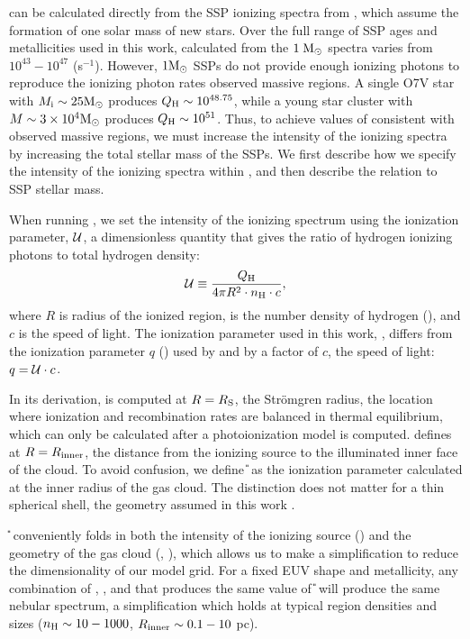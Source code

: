 \QH{} can be calculated directly from the SSP ionizing spectra from \FSPS, which assume the formation of one solar mass of new stars. Over the full range of SSP ages and metallicities used in this work, \QH{} calculated from the $1\;\mathrm{M_{\odot}}{}$ spectra varies from $10^{43} - 10^{47}$ (s$^{-1}$). However, $1\mathrm{M_{\odot}}$ SSPs do not provide enough ionizing photons to reproduce the ionizing photon rates observed massive \hii regions. A single O7V star with $M_{\mathrm{i}} \sim 25 \mathrm{M_{\odot}}$ produces $Q_{\mathrm{H}} \sim 10^{48.75}$, while a young star cluster with $M \sim 3 \times 10^4 \mathrm{M_{\odot}}$ produces $Q_{\mathrm{H}}{} \sim 10^{51}$. Thus, to achieve values of \QH{} consistent with observed massive \hii regions, we must increase the intensity of the ionizing spectra by increasing the total stellar mass of the SSPs. We first describe how we specify the intensity of the ionizing spectra within \Cloudy, and then describe the relation to SSP stellar mass.

When running \Cloudy, we set the intensity of the ionizing spectrum using the ionization parameter, $\mathcal{U}$, a dimensionless quantity that gives the ratio of hydrogen ionizing photons to total hydrogen density:
\begin{equation}\label{eq:logU}
    \mathcal{U} \equiv \frac{Q_{\mathrm{H}}{}}{4 \pi R^2 \cdot n_{\mathrm{H}} \cdot c},
\end{equation}
where $R$ is radius of the ionized region, \nH{} is the number density of hydrogen (), and $c$ is the speed of light. The ionization parameter used in this work, \Up{}, differs from the ionization parameter $q$ (\cms) used by \citet{Levesque10} and \citet{Dopita13} by a factor of $c$, the speed of light: $q = \mathcal{U} \cdot c$.

In its derivation, \Up{} is computed at $R = R_{\mathrm{S}}$, the Str\"omgren radius, the location where ionization and recombination rates are balanced in thermal equilibrium, which can only be calculated after a photoionization model is computed. \Cloudy defines \Up{} at $R = R_{\mathrm{inner}}$, the distance from the ionizing source to the illuminated inner face of the cloud. To avoid confusion, we define \U{} as the ionization parameter calculated at the inner radius of the gas cloud. The distinction does not matter for a thin spherical shell, the geometry assumed in this work \citep[for details see][]{CL01}.

\U{} conveniently folds in both the intensity of the ionizing source (\QH{}) and the geometry of the gas cloud (\Rin{}, \nH{}), which allows us to make a simplification to reduce the dimensionality of our model grid. For a fixed EUV shape and metallicity, any combination of \QH{}, \Rin{}, and \nH{} that produces the same value of \U{} will produce the same nebular spectrum, a simplification which holds at typical \hii region densities and sizes ($n_{\mathrm{H}}{} \sim 10-1000$, $R_{\mathrm{inner}} \sim 0.1-10$ pc). 

